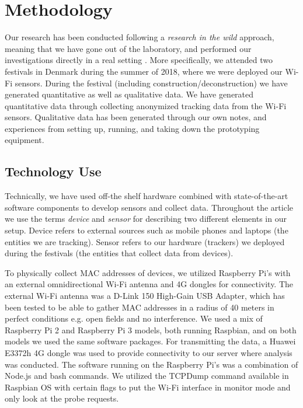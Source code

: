 \section{Methodology}

Our research has been conducted following a \textit{research in the wild} approach, meaning that we have gone out of the laboratory, and performed our investigations directly in a real setting \cite{Chamberlain2012}. More specifically, we attended two festivals in Denmark during the summer of 2018, where we were deployed our Wi-Fi sensors. During the festival (including construction/deconstruction) we have generated quantitative as well as qualitative data. We have generated quantitative data through collecting anonymized tracking data from the Wi-Fi sensors. Qualitative data has been generated through our own notes, and experiences from setting up, running, and taking down the prototyping equipment.

\subsection{Technology Use} \label{technology use}
Technically, we have used off-the shelf hardware combined with state-of-the-art software components to develop sensors and collect data. Throughout the article we use the terms \textit{device} and \textit{sensor} for describing two different elements in our setup. Device refers to external sources such as mobile phones and laptops (the entities we are tracking). Sensor refers to our hardware (trackers) we deployed during the festivals (the entities that collect data from devices).

To physically collect MAC addresses of devices, we utilized Raspberry Pi’s with an external omnidirectional Wi-Fi antenna and 4G dongles for connectivity. The external Wi-Fi antenna was a D-Link 150 High-Gain USB Adapter, which has been tested to be able to gather MAC addresses in a radius of 40 meters in perfect conditions e.g. open fields and no interference. We used a mix of Raspberry Pi 2 and Raspberry Pi 3 models, both running Raspbian, and on both models we used the same software packages. For transmitting the data, a Huawei E3372h 4G dongle was used to provide connectivity to our server where analysis was conducted. The software running on the Raspberry Pi’s was a combination of Node.js and bash commands. We utilized the TCPDump \cite{tcpdump} command available in Raspbian OS with certain flags to put the Wi-Fi interface in monitor mode and only look at the probe requests.

